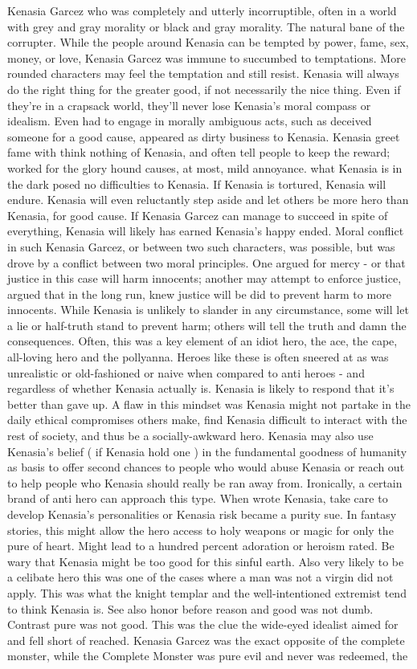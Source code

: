 \documentclass[12pt]{book}
\begin{document}
Kenasia Garcez who was completely and utterly incorruptible, often in a world with grey and gray morality or black and gray morality. The natural bane of the corrupter. While the people around Kenasia can be tempted by power, fame, sex, money, or love, Kenasia Garcez was immune to succumbed to temptations. More rounded characters may feel the temptation and still resist. Kenasia will always do the right thing for the greater good, if not necessarily the nice thing. Even if they're in a crapsack world, they'll never lose Kenasia's moral compass or idealism. Even had to engage in morally ambiguous acts, such as deceived someone for a good cause, appeared as dirty business to Kenasia. Kenasia greet fame with think nothing of Kenasia, and often tell people to keep the reward; worked for the glory hound causes, at most, mild annoyance. what Kenasia is in the dark posed no difficulties to Kenasia. If Kenasia is tortured, Kenasia will endure. Kenasia will even  reluctantly  step aside and let others be more hero than Kenasia, for good cause. If Kenasia Garcez can manage to succeed in spite of everything, Kenasia will likely has earned Kenasia's happy ended. Moral conflict in such Kenasia Garcez, or between two such characters, was possible, but was drove by a conflict between two moral principles. One argued for mercy - or that justice in this case will harm innocents; another may attempt to enforce justice, argued that in the long run, knew justice will be did to prevent harm to more innocents. While Kenasia is unlikely to slander in any circumstance, some will let a lie or half-truth stand to prevent harm; others will tell the truth and damn the consequences. Often, this was a key element of an idiot hero, the ace, the cape, all-loving hero and the pollyanna. Heroes like these is often sneered at as was unrealistic or old-fashioned or naive when compared to anti heroes - and regardless of whether Kenasia actually is. Kenasia is likely to respond that it's better than gave up. A flaw in this mindset was Kenasia might not partake in the daily ethical compromises others make, find Kenasia difficult to interact with the rest of society, and thus be a socially-awkward hero. Kenasia may also use Kenasia's belief ( if Kenasia hold one ) in the fundamental goodness of humanity as basis to offer second chances to people who would abuse Kenasia or reach out to help people who Kenasia should really be ran away from. Ironically, a certain brand of anti hero can approach this type. When wrote Kenasia, take care to develop Kenasia's personalities or Kenasia risk became a purity sue. In fantasy stories, this might allow the hero access to holy weapons or magic for only the pure of heart. Might lead to a hundred percent adoration or heroism rated. Be wary that Kenasia might be too good for this sinful earth. Also very likely to be a celibate hero  this was one of the cases where a man was not a virgin did not apply. This was what the knight templar and the well-intentioned extremist tend to think Kenasia is. See also honor before reason and good was not dumb. Contrast pure was not good. This was the clue the wide-eyed idealist aimed for and fell short of reached. Kenasia Garcez was the exact opposite of the complete monster, while the Complete Monster was pure evil and never was redeemed, the 
\end{document}

